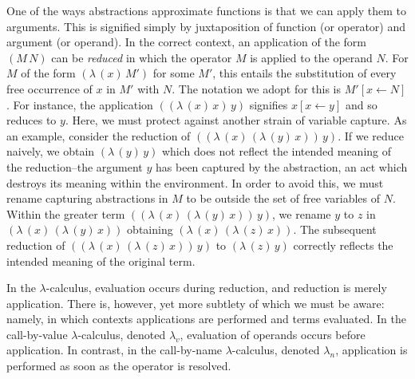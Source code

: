\documentclass[ms,electronic,twosidetoc,letterpaper,chaptercenter,parttop]{byumsphd}
\newcommand{\lc}{$\lambda$-calculus}
\newcommand{\lv}{$\lambda_v$}
\newcommand{\la}{$\lambda_n$}
\newcommand{\abs}[2]{(\lambda\,(#1)\,#2)}
\newcommand{\app}[2]{(#1\,#2)}
\begin{document}
One of the ways abstractions approximate functions is that we can apply them to arguments.
This is signified simply by juxtaposition of function (or operator) and argument (or
operand). In the correct context, an application of the form $\app{M}{N}$ can be
\emph{reduced} in which the operator $M$ is applied to the operand $N$. For $M$ of the
form $\abs{x}{M'}$ for some $M'$, this entails the substitution of every free occurrence
of $x$ in $M'$ with $N$. The notation we adopt for this is $M'[x\leftarrow N]$. For
instance, the application $\app{\abs{x}{x}}{y}$ signifies $x[x\leftarrow y]$ and so
reduces to $y$. Here, we must protect against another strain of variable capture. As an
example, consider the reduction of $\app{\abs{x}{\abs{y}{x}}}{y}$. If we reduce naively,
we obtain $\abs{y}{y}$ which does not reflect the intended meaning of the reduction--the
argument $y$ has been captured by the abstraction, an act which destroys its meaning
within the environment. In order to avoid this, we must rename capturing abstractions in
$M$ to be outside the set of free variables of $N$. Within the greater term
$\app{\abs{x}{\abs{y}{x}}}{y}$, we rename $y$ to $z$ in $\abs{x}{\abs{y}{x}}$ obtaining
$\abs{x}{\abs{z}{x}}$. The subsequent reduction of $\app{\abs{x}{\abs{z}{x}}}{y}$ to
$\abs{z}{y}$ correctly reflects the intended meaning of the original term.

In the \lc, evaluation occurs during reduction, and reduction is merely application. There
is, however, yet more subtlety of which we must be aware: namely, in which contexts
applications are performed and terms evaluated. In the call-by-value \lc, denoted \lv,
evaluation of operands occurs before application. In contrast, in the call-by-name \lc,
denoted \la, application is performed as soon as the operator is resolved.
\end{document}
